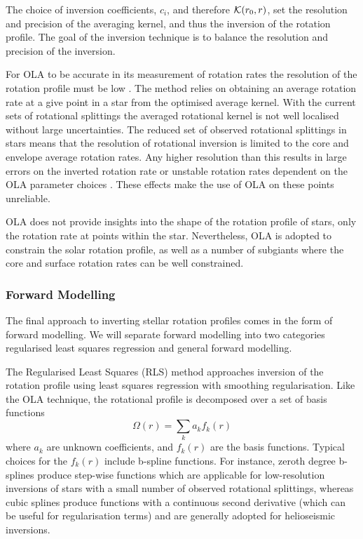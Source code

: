 The choice of inversion coefficients, $c_i$, and therefore $\mathcal{K}(r_0,r)$, set the resolution and precision of the averaging kernel, and thus the inversion of the rotation profile. 
The goal of the inversion technique is to balance the resolution and precision of the inversion.

For OLA to be accurate in its measurement of rotation rates the resolution of the rotation profile must be low \citep{pijpers_sola_1994}. 
The method relies on obtaining an average rotation rate at a give point in a star from the optimised average kernel. 
With the current sets of rotational splittings the averaged rotational kernel is not well localised without large uncertainties.
The reduced set of observed rotational splittings in stars means that the resolution of rotational inversion is limited to the core and envelope average rotation rates. 
Any higher resolution than this results in large errors on the inverted rotation rate or unstable rotation rates dependent on the OLA parameter choices \citep{christensen-dalsgaard_generalized_1993}. These effects make the use of OLA on these points unreliable. 

OLA does not provide insights into the shape of the rotation profile of stars, only the rotation rate at points within the star.
Nevertheless, OLA is adopted to constrain the solar rotation profile, as well as a number of subgiants where the core and surface rotation rates can be well constrained.

\subsubsection*{Forward Modelling}


The final approach to inverting stellar rotation profiles comes in the form of forward modelling.
We will separate forward modelling into two categories regularised least squares regression and general forward modelling.

The Regularised Least Squares (RLS) method approaches inversion of the rotation profile using least squares regression with smoothing regularisation.
Like the OLA technique, the rotational profile is decomposed over a set of basis functions
\begin{equation}
\Omega(r) = \sum_k a_k f_k(r)
\end{equation}
where $a_k$ are unknown coefficients, and $f_k(r)$ are the basis functions.
Typical choices for the $f_k(r)$ include b-spline functions.
For instance, zeroth degree b-splines produce step-wise functions which are applicable for low-resolution inversions of stars with a small number of observed rotational splittings, whereas cubic splines produce functions with a continuous second derivative (which can be useful for regularisation terms) and are generally adopted for helioseismic inversions.

